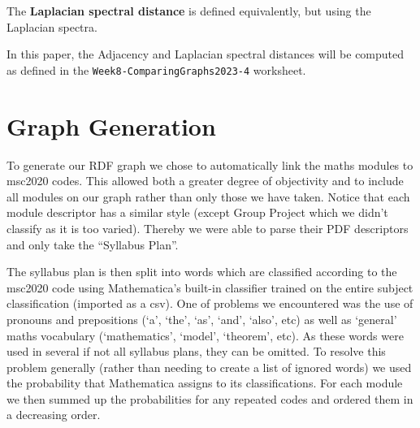 \documentclass[english, 12pt]{article}
\begin{document}
The {\bf Laplacian spectral distance} is defined equivalently, but using the Laplacian spectra.

In this paper, the Adjacency and Laplacian spectral distances will be computed as defined in the \texttt{Week8-ComparingGraphs2023-4} worksheet.

\section{Graph Generation} \label{sec:graph_gen}
To generate our RDF graph we chose to automatically link the maths modules to msc2020\cite{msc_2010} codes. This allowed both a greater degree of objectivity and to include all modules on our graph rather than only those we have taken. Notice that each module descriptor has a similar style (except Group Project which we didn't classify as it is too varied). Thereby we were able to parse their PDF descriptors and only take the ``Syllabus Plan''.

The syllabus plan is then split into words which are classified according to the msc2020 code using Mathematica's built-in classifier trained on the entire subject classification (imported as a csv). One of problems we encountered was the use of pronouns and prepositions (`a', `the', `as', `and', `also', etc) as well as `general' maths vocabulary (`mathematics', `model', `theorem', etc). As these words were used in several if not all syllabus plans, they can be omitted. To resolve this problem generally (rather than needing to create a list of ignored words) we used the probability that Mathematica assigns to its classifications. For each module we then summed up the probabilities for any repeated codes and ordered them in a decreasing order.
\end{document}
